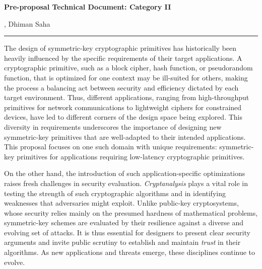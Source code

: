 
\newcommand{\soptitle}{Pre-proposal Technical Document: Category II}

\begin{center}
\vspace*{-0.8cm}
{\sffamily\bfseries\Large \textcolor{theme}{\soptitle}}\par
\vspace{2pt}
{\small \yourname, Dhiman Saha}
\vspace{8pt}
\hrule
\end{center}

The design of symmetric-key cryptographic primitives has historically been heavily influenced by the specific requirements of their target applications.
A cryptographic primitive, such as a block cipher, hash function, or pseudorandom function, that is optimized for one context may be ill-suited for others, making the process a balancing act between security and efficiency dictated by each target environment.
Thus, different applications, ranging from high-throughput primitives for network communications to lightweight ciphers for constrained devices, have led to different corners of the design space being explored.
This diversity in requirements underscores the importance of designing new symmetric-key primitives that are well-adapted to their intended applications.
This proposal focuses on one such domain with unique requirements: symmetric-key primitives for applications requiring low-latency cryptographic primitives.

On the other hand, the introduction of such application-specific optimizations raises fresh challenges in security evaluation.
\emph{Cryptanalysis} plays a vital role in testing the strength of such cryptographic algorithms and in identifying weaknesses that adversaries might exploit.
Unlike public-key cryptosystems, whose security relies mainly on the presumed hardness of mathematical problems, symmetric-key schemes are evaluated by their resilience against a diverse and evolving set of attacks.
It is thus essential for designers to present clear security arguments and invite public scrutiny to establish and maintain \emph{trust} in their algorithms.
As new applications and threats emerge, these disciplines continue to evolve.

